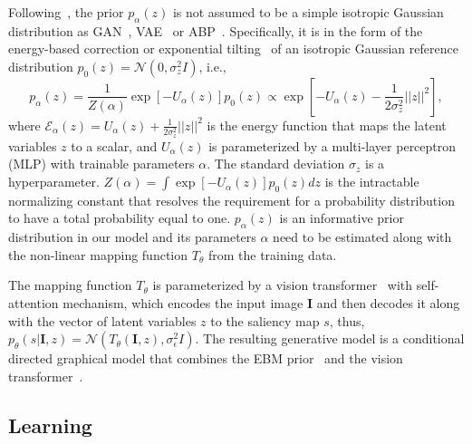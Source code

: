 \documentclass{article}
\begin{document}
Following~\cite{ebm_prior}, the prior $p_{\alpha}(z)$ is not assumed to be a simple isotropic Gaussian distribution as GAN~\cite{GAN_nips}, VAE~\cite{vae_bayes_kumar, structure_output} or ABP~\cite{abp}. 
Specifically, it is in the form of the energy-based correction or exponential tilting~\cite{xie2016theory} of an isotropic Gaussian reference distribution $p_0(z)=\mathcal{N}(0,\sigma_z^2I)$, i.e., 
\begin{equation}
     p_\alpha(z)= \frac{1}{Z(\alpha)} \exp \left[-U_{\alpha}(z) \right] p_{0}(z) \propto \exp \left[-U_{\alpha}(z)-\frac{1}{2\sigma_z^2}||z||^2 \right], \label{eq:ebm_prior}
\end{equation}
where $\mathcal{E}_{\alpha}(z)=U_{\alpha}(z)+\frac{1}{2\sigma_{z}^2}||z||^2$ is the energy function that maps the latent variables $z$ to a scalar, and $U_{\alpha}(z)$ is parameterized by a multi-layer perceptron (MLP) with trainable parameters $\alpha$. The standard deviation $\sigma_z$ is a hyperparameter. $Z(\alpha)=\int \exp[-U_{\alpha}(z)]p_0(z)dz$ is the intractable normalizing constant that resolves the requirement for a probability distribution to have a total probability equal to one. $p_{\alpha}(z)$ is an informative prior distribution in our model and its parameters $\alpha$ need to be estimated along with the non-linear mapping function $T_{\theta}$ from the training data.

The mapping function $T_{\theta}$ is parameterized by a vision  transformer~\cite{liu2021swin} with self-attention mechanism, which encodes the input image $\textbf{I}$ and then decodes it along with the vector of latent variables $z$ to the saliency map $s$, thus, $p_{\theta}(s|\textbf{I},z)=\mathcal{N}(T_{\theta}(\textbf{I},z),\sigma_{\epsilon}^2 I)$. The resulting generative model is a conditional directed graphical model that combines the EBM prior~\cite{ebm_prior} and the vision transformer~\cite{liu2021swin}.  

\subsection{Learning}
\end{document}

